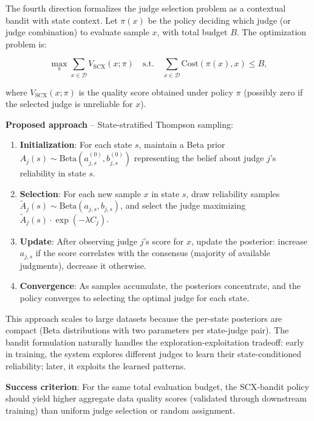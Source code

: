 \documentclass[11pt,twocolumn]{article}
\begin{document}
The fourth direction formalizes the judge selection problem as a contextual bandit with state context. Let $\pi(x)$ be the policy deciding which judge (or judge combination) to evaluate sample $x$, with total budget $B$. The optimization problem is:

\begin{equation}
\max_{\pi} \sum_{x \in \mathcal{D}} V_{\text{SCX}}(x; \pi) \quad \text{s.t.} \quad \sum_{x \in \mathcal{D}} \text{Cost}(\pi(x), x) \leq B,
\label{eq:bandit_objective}
\end{equation}

where $V_{\text{SCX}}(x; \pi)$ is the quality score obtained under policy $\pi$ (possibly zero if the selected judge is unreliable for $x$).

\textbf{Proposed approach} -- State-stratified Thompson sampling:
\begin{enumerate}
    \item \textbf{Initialization}: For each state $s$, maintain a Beta prior $A_j(s) \sim \text{Beta}(a_{j,s}^{(0)}, b_{j,s}^{(0)})$ representing the belief about judge $j$'s reliability in state $s$.
    \item \textbf{Selection}: For each new sample $x$ in state $s$, draw reliability samples $\tilde{A}_j(s) \sim \text{Beta}(a_{j,s}, b_{j,s})$, and select the judge maximizing $\tilde{A}_j(s) \cdot \exp(-\lambda C_j)$.
    \item \textbf{Update}: After observing judge $j$'s score for $x$, update the posterior: increase $a_{j,s}$ if the score correlates with the consensus (majority of available judgments), decrease it otherwise.
    \item \textbf{Convergence}: As samples accumulate, the posteriors concentrate, and the policy converges to selecting the optimal judge for each state.
\end{enumerate}

This approach scales to large datasets because the per-state posteriors are compact (Beta distributions with two parameters per state-judge pair). The bandit formulation naturally handles the exploration-exploitation tradeoff: early in training, the system explores different judges to learn their state-conditioned reliability; later, it exploits the learned patterns.

\textbf{Success criterion}: For the same total evaluation budget, the SCX-bandit policy should yield higher aggregate data quality scores (validated through downstream training) than uniform judge selection or random assignment.
\end{document}
